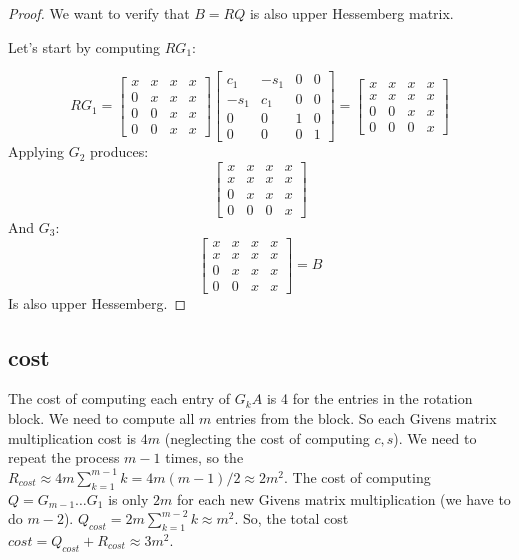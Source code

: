 \documentclass[10pt]{article}
\begin{document}
\begin{proof}
We want to verify that $B= RQ$ is also upper Hessemberg matrix.

Let's start by computing $R G_1$:


  \[
    R G_1 = 
            \begin{bmatrix}
            x  & x & x & x \\
            0  & x & x & x \\
            0  & 0 & x & x \\
            0  & 0 & x & x 
            \end{bmatrix}
          \begin{bmatrix}
            c_1  &-s_1 & 0 & 0 \\
           -s_1  & c_1 & 0 & 0 \\
            0    & 0   & 1 & 0 \\
            0    & 0   & 0 & 1 
            \end{bmatrix} =
            \begin{bmatrix}
            x  & x & x & x \\
            x  & x & x & x \\
            0  & 0 & x & x \\
            0  & 0 & 0 & x 
            \end{bmatrix}
  \]
Applying $G_2$ produces:
\[
            \begin{bmatrix}
            x  & x & x & x \\
            x  & x & x & x \\
            0  & x & x & x \\
            0  & 0 & 0 & x 
            \end{bmatrix}
  \]
And $G_3$:
\[
            \begin{bmatrix}
            x  & x & x & x \\
            x  & x & x & x \\
            0  & x & x & x \\
            0  & 0 & x & x 
            \end{bmatrix} = B
  \]
Is also upper Hessemberg.

\end{proof}
\subsection{cost}
  The cost of computing each entry of $G_kA$ is 4 for the entries in the rotation block. We need
 to compute all $m$ entries  from the block. So each Givens matrix multiplication cost is $4m$
  (neglecting the cost of computing $c,s$). 
We need to repeat the process $m-1$ times, so the $R_{cost}\approx 4m\sum_{k=1}^{m-1} k = 4m(m-1)/2 \approx 2m^2$.
The cost of computing $Q=G_{m-1}\dots G_1$ is only $2m$ for each new Givens matrix multiplication (we have to do $m-2$). 
$Q_{cost}= 2m\sum_{k=1}^{m-2} k  \approx m^2$. So, the total cost $cost=Q_{cost}+R_{cost}\approx 3m^2$.
\end{document}
